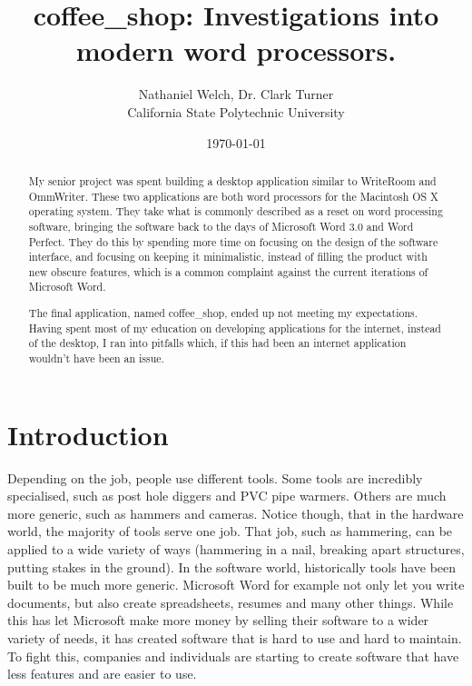 \documentclass[11pt]{article}
\begin{document}
\title{\vfill coffee\_shop: Investigations into modern word processors.}
\author{
Nathaniel Welch, Dr. Clark Turner\vspace{10pt} \\
California State Polytechnic University\vspace{10pt} \\
}
\date{\today}
\maketitle

\doublespacing

\vfill
\begin{abstract}
My senior project was spent building a desktop application similar to WriteRoom and OmmWriter. These two applications are both word processors for the Macintosh OS X operating system. They take what is commonly described as a reset on word processing software, bringing the software back to the days of Microsoft Word 3.0 and Word Perfect. They do this by spending more time on focusing on the design of the software interface, and focusing on keeping it minimalistic, instead of filling the product with new obscure features, which is a common complaint against the current iterations of Microsoft Word.

The final application, named coffee\_shop, ended up not meeting my expectations. Having spent most of my education on developing applications for the internet, instead of the desktop, I ran into pitfalls which, if this had been an internet application wouldn't have been an issue.
\end{abstract}

\thispagestyle{empty}
\newpage

\thispagestyle{empty} %
\tableofcontents

\newpage

\section{Introduction}

Depending on the job, people use different tools. Some tools are incredibly specialised, such as post hole diggers and PVC pipe warmers. Others are much more generic, such as hammers and cameras. Notice though, that in the hardware world, the majority of tools serve one job. That job, such as hammering, can be applied to a wide variety of ways (hammering in a nail, breaking apart structures, putting stakes in the ground). In the software world, historically tools have been built to be much more generic. Microsoft Word for example not only let you write documents, but also create spreadsheets, resumes and many other things. While this has let Microsoft make more money by selling their software to a wider variety of needs, it has created software that is hard to use and hard to maintain. To fight this, companies and individuals are starting to create software that have less features and are easier to use.
\end{document}
